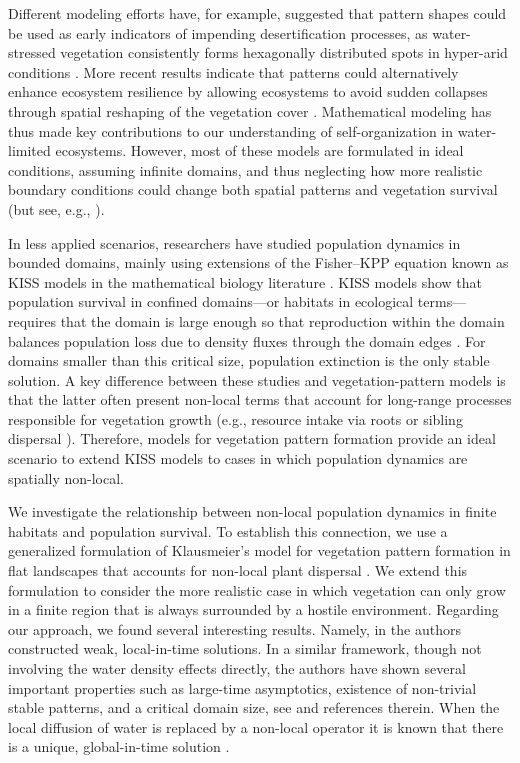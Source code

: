 \documentclass[11pt, a4paper]{article}
\theoremstyle{break}
\theoremstyle{break}
\theoremstyle{break}
\theoremstyle{break}
\theoremstyle{break}
\theoremstyle{break}
\theoremstyle{break}
\theoremstyle{break}
\theoremstyle{break}
\theoremstyle{break}
\begin{document}
Different modeling efforts have, for example, suggested that pattern shapes could be used as early indicators of impending desertification processes, as water-stressed vegetation consistently forms hexagonally distributed spots in hyper-arid conditions \cite{Lefever1997,VonHardenberg2001,Meron2004,Rietkerk2002}. More recent results indicate that patterns could alternatively enhance ecosystem resilience by allowing ecosystems to avoid sudden collapses through spatial reshaping of the vegetation cover \cite{Rietkerk2021}. Mathematical modeling has thus made key contributions to our understanding of self-organization in water-limited ecosystems. However, most of these models are formulated in ideal conditions, assuming infinite domains, and thus neglecting how more realistic boundary conditions could change both spatial patterns and vegetation survival (but see, e.g., \cite{Clerc2021,PintoRamos2023,PintoRamos2025}).

In less applied scenarios, researchers have studied population dynamics in bounded domains, mainly using extensions of the Fisher–KPP equation \cite{Cantrell1999,Fagan2009,Colombo2018,Dornelas2024} known as KISS models in the mathematical biology literature \cite{Skellam1951,Kierstead1953}. KISS models show that population survival in confined domains---or habitats in ecological terms---requires that the domain is large enough so that reproduction within the domain balances population loss due to density fluxes through the domain edges \cite{Cantrell2004}. For domains smaller than this critical size, population extinction is the only stable solution. A key difference between these studies and vegetation-pattern models is that the latter often present non-local terms that account for long-range processes responsible for vegetation growth (e.g., resource intake via roots or sibling dispersal \cite{Martinez-Garcia2014,Eigentler2018}). Therefore, models for vegetation pattern formation provide an ideal scenario to extend KISS models to cases in which population dynamics are spatially non-local. 

We investigate the relationship between non-local population dynamics in finite habitats and population survival. To establish this connection, we use a generalized formulation of Klausmeier's model for vegetation pattern formation in flat landscapes that accounts for non-local plant dispersal \cite{Eigentler2018,Klausmeier1999}. We extend this formulation to consider the more realistic case in which vegetation can only grow in a finite region that is always surrounded by a hostile environment. Regarding our approach, we found several interesting results. Namely, in \cite{JaramilloMeraz2024,CappaneraJaramilloWard2024} the authors constructed weak, local-in-time solutions. In a similar framework, though not involving the water density effects directly, the authors have shown several important properties such as large-time asymptotics, existence of non-trivial stable patterns, and a critical domain size, see \cite{Tadej2025,BaiLiWang2025,ReimerBonsallMaini2015,Sun2023} and references therein. When the local diffusion of water is replaced by a non-local operator it is known that there is a unique, global-in-time solution \cite{LaurencotWalker2023}.
\end{document}
